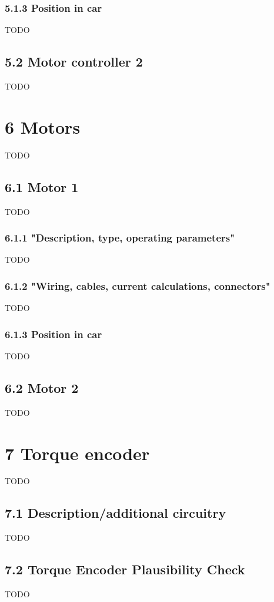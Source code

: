\documentclass{article}
\begin{document}
\subsubsection*{5.1.3 Position in car}
TODO

\subsection*{5.2 Motor controller 2}
TODO

\section*{6 Motors}
TODO

\subsection*{6.1 Motor 1}
TODO

\subsubsection*{6.1.1 "Description, type, operating parameters"}
TODO

\subsubsection*{6.1.2 "Wiring, cables, current calculations, connectors"}
TODO

\subsubsection*{6.1.3 Position in car}
TODO

\subsection*{6.2 Motor 2}
TODO

\section*{7 Torque encoder}
TODO

\subsection*{7.1 Description/additional circuitry}
TODO

\subsection*{7.2 Torque Encoder Plausibility Check}
TODO
\end{document}
